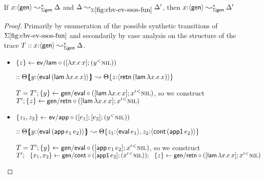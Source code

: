 \bigskip
\begin{theorem}~\\
  If $x{:}\langle {\sf gen} \rangle \leadsto^*_{\Sigma\sf gen} \Delta$ and
  $\Delta \leadsto_{\Sigma\ref{fig:cbv-ev-ssos-fun}} \Delta'$, then
  $x{:} \langle {\sf gen} \rangle \leadsto^*_{\Sigma\sf gen} \Delta'$
\end{theorem}

\begin{proof}
  Primarily by enumeration of the possible synthetic transitions of
  $\Sigma\ref{fig:cbv-ev-ssos-fun}$ and secondarily by case analysis
  on the structure of the trace $T :: x{:}\langle {\sf gen} \rangle
  \leadsto^*_{\Sigma\sf gen} \Delta$.

  \begin{itemize}
  \item $\{{z}\} \leftarrow {\sf ev/lam} \circ {([{\lambda x.e\,x}]; {({y}{^{<}}{\textsc{nil}})})}$

    \qquad $:: {\Theta}\mbox{$\{\hspace{-4pt}\{$}{y{:}\langle {{\sf eval}\,({\sf lam}\,\lambda x.e\,x)} \rangle}\mbox{$\}\hspace{-4pt}\}$}
               \leadsto
               {\Theta}\{{z{:}\langle {{\sf retn}\,({\sf lam}\,\lambda x.e\,x)} \rangle}\} $

    \medskip

    $T = T'; \{{y}\} \leftarrow {\sf gen/eval} \circ {([{{\sf lam}\,\lambda x.e\,x}]; {{x'}{^{<}}{\textsc{nil}}})}$,
    so we construct\\
    $T'; \{{z}\} \leftarrow {\sf gen/retn} \circ {([{{\sf lam}\,\lambda x.e\,x}]; {{x'}{^{<}}{\textsc{nil}}})}$

    \medskip

  \item $\{{z_1, z_2}\} \leftarrow {\sf ev/app} \circ {([{e_1}]; {[{e_2}]; {({y}{^{<}}{\textsc{nil}})}})}$

    \qquad $:: {\Theta}\mbox{$\{\hspace{-4pt}\{$}{y{:}\langle {{\sf eval}\,({\sf app}\,e_1\,e_2)} \rangle}\mbox{$\}\hspace{-4pt}\}$}
               \leadsto
               {\Theta}\{{{z_1{:}\langle {{\sf eval}\,e_1} \rangle},{z_2{:}\langle {{\sf cont}\,({\sf app1}\,e_2)} \rangle}}\} $

    \medskip

    $T = T'; \{{y}\} \leftarrow {\sf gen/eval} \circ {([{{\sf app}\,e_1\,e_2}]; {{x'}{^{<}}{\textsc{nil}}})}$,
    so we construct\\
    $T'; ~~
     \{{x_1, x_2}\} \leftarrow {\sf gen/cont} \circ {([{{\sf app1}\,e_2}]; {({x'}{^{<}}{\textsc{nil}})})}; ~~
     \{{z}\} \leftarrow {\sf gen/retn} \circ {([{{\sf lam}\,\lambda x.e\,x}]; {{x'}{^{<}}{\textsc{nil}}})}$


\end{itemize}
\end{proof}
